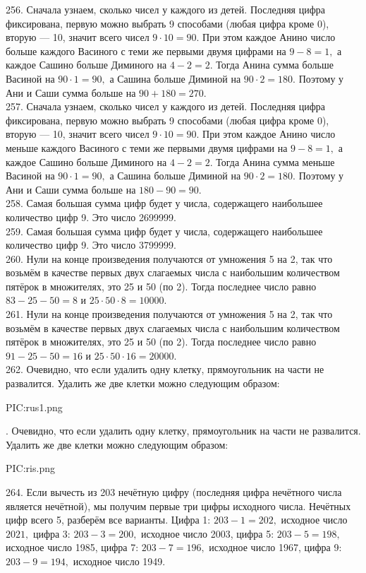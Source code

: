256. Сначала узнаем, сколько чисел у каждого из детей. Последняя цифра фиксирована, первую можно выбрать 9 способами (любая цифра кроме 0), вторую --- 10, значит всего чисел $9\cdot10=90.$ При этом каждое Анино число больше каждого Васиного с теми же первыми двумя цифрами на $9-8=1,$ а каждое Сашино больше Диминого на $4-2=2.$ Тогда Анина сумма больше Васиной на $90\cdot1=90,$ а Сашина больше Диминой на $90\cdot2=180.$ Поэтому у Ани и Саши сумма больше на $90+180=270.$\\
257. Сначала узнаем, сколько чисел у каждого из детей. Последняя цифра фиксирована, первую можно выбрать 9 способами (любая цифра кроме 0), вторую --- 10, значит всего чисел $9\cdot10=90.$ При этом каждое Анино число меньше каждого Васиного с теми же первыми двумя цифрами на $9-8=1,$ а каждое Сашино больше Диминого на $4-2=2.$ Тогда Анина сумма меньше Васиной на $90\cdot1=90,$ а Сашина больше Диминой на $90\cdot2=180.$ Поэтому у Ани и Саши сумма больше на $180-90=90.$\\
258. Самая большая сумма цифр будет у числа, содержащего наибольшее количество цифр 9. Это число 2699999.\\
259. Самая большая сумма цифр будет у числа, содержащего наибольшее количество цифр 9. Это число 3799999.\\
260. Нули на конце произведения получаются от умножения 5 на 2, так что возьмём в качестве первых двух слагаемых числа с наибольшим количеством пятёрок в множителях, это 25 и 50 (по 2). Тогда последнее число равно $83-25-50=8$ и $25\cdot50\cdot8=10000.$\\
261. Нули на конце произведения получаются от умножения 5 на 2, так что возьмём в качестве первых двух слагаемых числа с наибольшим количеством пятёрок в множителях, это 25 и 50 (по 2). Тогда последнее число равно $91-25-50=16$ и $25\cdot50\cdot16=20000.$\\
262. Очевидно, что если удалить одну клетку, прямоугольник на части не развалится. Удалить же две клетки можно следующим образом:
\begin{center}
{{PIC:rus1.png}}
\end{center}
\newpage{}. Очевидно, что если удалить одну клетку, прямоугольник на части не развалится. Удалить же две клетки можно следующим образом:
\begin{center}
{{PIC:ris.png}}
\end{center}
264. Если вычесть из 203 нечётную цифру (последняя цифра нечётного числа является нечётной), мы получим первые три цифры исходного числа. Нечётных цифр всего 5, разберём все варианты. Цифра 1: $203-1=202,$ исходное число $2021,$ цифра 3: $203-3=200,$ исходное число 2003, цифра 5: $203-5=198,$ исходное число 1985, цифра 7: $203-7=196,$ исходное число 1967, цифра 9: $203-9=194,$ исходное число 1949.\\
